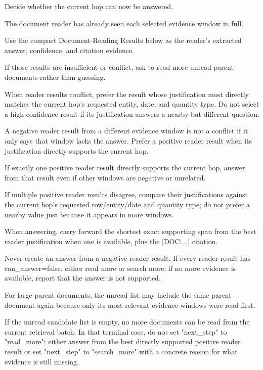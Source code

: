 \begin{tcolorbox}[colback=white, colframe=my-green, coltitle=black, parskip=5mm, title=\textbf{Hop Resolve with Sample Output}, halign=flush left, enhanced, breakable, skin first=enhanced, skin middle=enhanced, skin last=enhanced]
\begin{scriptsize}
\ttfamily
\setlength{\parindent}{0pt}
Decide whether the current hop can now be answered.\par
\mbox{}\par
The document reader has already seen each selected evidence window in full.\par
Use the compact Document-Reading Results below as the reader's extracted answer, confidence, and citation evidence.\par
If those results are insufficient or conflict, ask to read more unread parent documents rather than guessing.\par
When reader results conflict, prefer the result whose justification most directly matches the current hop's requested entity, date, and quantity type. Do not select a high-confidence result if its justification answers a nearby but different question.\par
A negative reader result from a different evidence window is not a conflict if it only says that window lacks the answer. Prefer a positive reader result when its justification directly supports the current hop.\par
If exactly one positive reader result directly supports the current hop, answer from that result even if other windows are negative or unrelated.\par
If multiple positive reader results disagree, compare their justifications against the current hop's requested row/entity/date and quantity type; do not prefer a nearby value just because it appears in more windows.\par
When answering, carry forward the shortest exact supporting span from the best reader justification when one is available, plus the [DOC:...] citation.\par
Never create an answer from a negative reader result. If every reader result has can\_answer=false, either read more or search more; if no more evidence is available, report that the answer is not supported.\par
For large parent documents, the unread list may include the same parent document again because only its most relevant evidence windows were read first.\par
If the unread candidate list is empty, no more documents can be read from the current retrieval batch. In that terminal case, do not set "next\_step" to "read\_more"; either answer from the best directly supported positive reader result or set "next\_step" to "search\_more" with a concrete reason for what evidence is still missing.\par

\end{scriptsize}
\end{tcolorbox}
